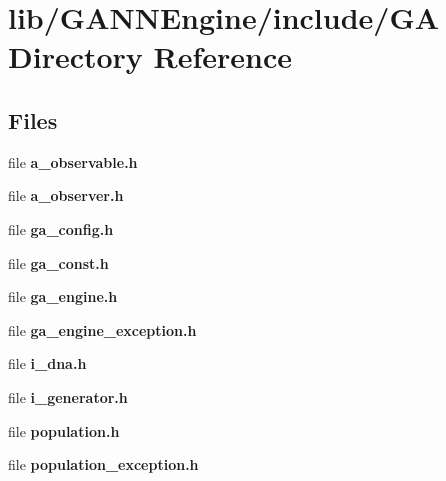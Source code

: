 \section{lib/\+G\+A\+N\+N\+Engine/include/\+G\+A Directory Reference}
\label{dir_76961798f44b5502661de2e54cbf717e}
\subsection*{Files}
\begin{DoxyCompactItemize}
\item 
file {\bfseries a\+\_\+observable.\+h}
\item 
file {\bfseries a\+\_\+observer.\+h}
\item 
file {\bfseries ga\+\_\+config.\+h}
\item 
file {\bfseries ga\+\_\+const.\+h}
\item 
file {\bfseries ga\+\_\+engine.\+h}
\item 
file {\bfseries ga\+\_\+engine\+\_\+exception.\+h}
\item 
file {\bfseries i\+\_\+dna.\+h}
\item 
file {\bfseries i\+\_\+generator.\+h}
\item 
file {\bfseries population.\+h}
\item 
file {\bfseries population\+\_\+exception.\+h}
\end{DoxyCompactItemize}
